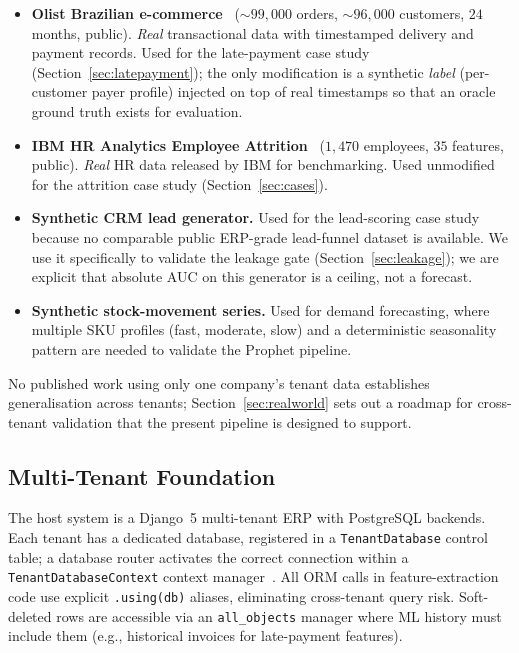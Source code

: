 \documentclass[conference]{IEEEtran}
\begin{document}
\begin{itemize}
    \item \textbf{Olist Brazilian e-commerce}~\cite{olist2018}
    ($\sim$$99{,}000$ orders, $\sim$$96{,}000$ customers, $24$ months,
    public). \emph{Real} transactional data with timestamped delivery and
    payment records. Used for the late-payment case study
    (Section~\ref{sec:latepayment}); the only modification is a synthetic
    \emph{label} (per-customer payer profile) injected on top of real
    timestamps so that an oracle ground truth exists for evaluation.
    \item \textbf{IBM HR Analytics Employee Attrition}~\cite{ibm2017hr}
    ($1{,}470$ employees, $35$ features, public). \emph{Real} HR data
    released by IBM for benchmarking. Used unmodified for the attrition
    case study (Section~\ref{sec:cases}).
    \item \textbf{Synthetic CRM lead generator.} Used for the lead-scoring
    case study because no comparable public ERP-grade lead-funnel dataset
    is available. We use it specifically to validate the leakage gate
    (Section~\ref{sec:leakage}); we are explicit that absolute AUC on this
    generator is a ceiling, not a forecast.
    \item \textbf{Synthetic stock-movement series.} Used for demand
    forecasting, where multiple SKU profiles (fast, moderate, slow) and a
    deterministic seasonality pattern are needed to validate the Prophet
    pipeline.
\end{itemize}

No published work using only one company's tenant data establishes
generalisation across tenants; Section~\ref{sec:realworld} sets out a
roadmap for cross-tenant validation that the present pipeline is designed
to support.

\subsection{Multi-Tenant Foundation}

The host system is a Django~5 multi-tenant ERP with PostgreSQL backends.
Each tenant has a dedicated database, registered in a \texttt{TenantDatabase}
control table; a database router activates the correct connection within a
\texttt{TenantDatabaseContext} context manager~\cite{bezemer2010multi,zhang2021multitenant}. All ORM calls in feature-extraction
code use explicit \texttt{.using(db)} aliases, eliminating cross-tenant query
risk. Soft-deleted rows are accessible via an \texttt{all\_objects} manager
where ML history must include them (e.g., historical invoices for
late-payment features).
\end{document}
